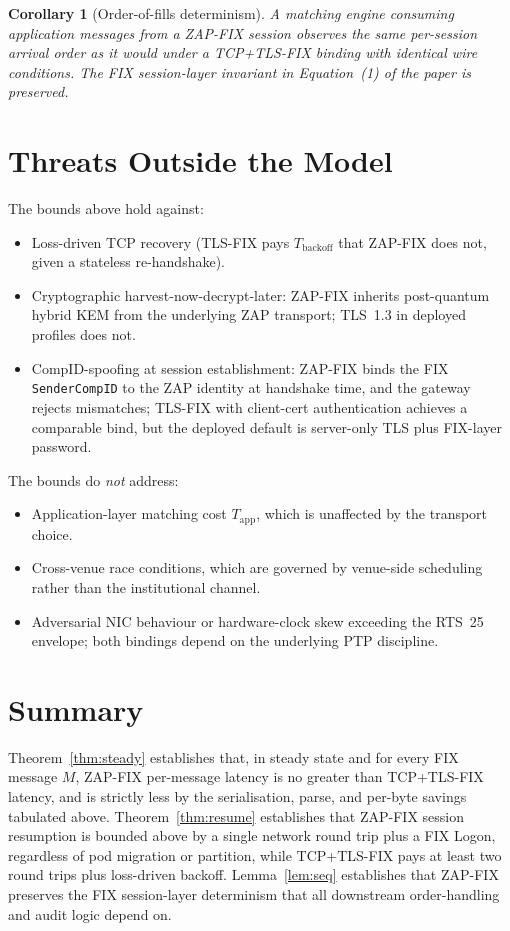 \documentclass[11pt,a4paper]{article}
\newtheorem{corollary}{Corollary}
\begin{document}
\begin{corollary}[Order-of-fills determinism]
A matching engine consuming application messages from a ZAP-FIX
session observes the same per-session arrival order as it would
under a TCP+TLS-FIX binding with identical wire conditions. The
FIX session-layer invariant in Equation~(1) of the paper is
preserved.
\end{corollary}

\section{Threats Outside the Model}
\label{sec:threats}

The bounds above hold against:
\begin{itemize}
  \item Loss-driven TCP recovery (TLS-FIX pays $T_{\mathrm{backoff}}$
        that ZAP-FIX does not, given a stateless re-handshake).
  \item Cryptographic harvest-now-decrypt-later: ZAP-FIX inherits
        post-quantum hybrid KEM from the underlying ZAP transport;
        TLS~1.3 in deployed profiles does not.
  \item CompID-spoofing at session establishment: ZAP-FIX binds the
        FIX \texttt{SenderCompID} to the ZAP identity at handshake
        time, and the gateway rejects mismatches; TLS-FIX with
        client-cert authentication achieves a comparable bind, but
        the deployed default is server-only TLS plus FIX-layer
        password.
\end{itemize}
The bounds do \emph{not} address:
\begin{itemize}
  \item Application-layer matching cost $T_{\mathrm{app}}$, which is
        unaffected by the transport choice.
  \item Cross-venue race conditions, which are governed by
        venue-side scheduling rather than the institutional channel.
  \item Adversarial NIC behaviour or hardware-clock skew exceeding
        the RTS~25 envelope; both bindings depend on the underlying
        PTP discipline.
\end{itemize}

\section{Summary}

Theorem~\ref{thm:steady} establishes that, in steady state and for
every FIX message $M$, ZAP-FIX per-message latency is no greater
than TCP+TLS-FIX latency, and is strictly less by the
serialisation, parse, and per-byte savings tabulated above.
Theorem~\ref{thm:resume} establishes that ZAP-FIX session
resumption is bounded above by a single network round trip plus a
FIX Logon, regardless of pod migration or partition, while
TCP+TLS-FIX pays at least two round trips plus loss-driven
backoff. Lemma~\ref{lem:seq} establishes that ZAP-FIX preserves the
FIX session-layer determinism that all downstream
order-handling and audit logic depend on.
\end{document}
